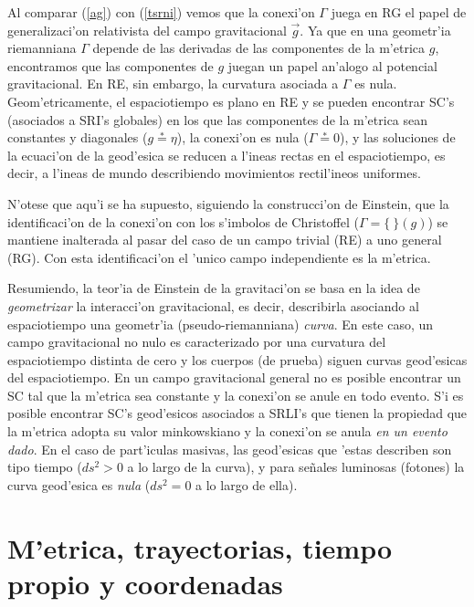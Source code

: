 Al comparar (\ref{ag}) con (\ref{tsrni}) vemos que la conexi'on $\Gamma$ juega en RG el papel de generalizaci'on relativista del campo gravitacional $\vec{g}$. Ya que en una geometr'ia riemanniana $\Gamma$ depende de las derivadas de las componentes de la m'etrica $g$, encontramos que las componentes de $g$ juegan un papel an'alogo al potencial gravitacional. En RE, sin embargo, la curvatura asociada a $\Gamma$ es nula. Geom'etricamente, el espaciotiempo es plano en RE y se pueden encontrar SC's (asociados a SRI's globales) en los que las componentes de la m'etrica sean constantes y diagonales ($g\stackrel{*}{=}\eta$), la conexi'on es nula ($\Gamma\stackrel{*}{=}0$), y las soluciones de la ecuaci'on de la geod'esica se reducen a l'ineas rectas en el espaciotiempo, es decir, a l'ineas de mundo describiendo movimientos rectil'ineos uniformes. 

N'otese que aqu'i se ha supuesto, siguiendo la construcci'on de
Einstein, que la identificaci'on de la conexi'on con los s'imbolos de Christoffel ($\Gamma %
=\{\ \}(g)$) se mantiene inalterada al pasar del caso de un campo
trivial (RE) a uno general (RG). Con esta identificaci'on el 'unico campo
independiente es la m'etrica.


Resumiendo, la teor'ia de Einstein de la gravitaci'on se basa en la idea de
\textit{geometrizar} la interacci'on gravitacional, es decir, describirla
asociando al espaciotiempo una geometr'ia (pseudo-riemanniana) \textit{curva}. En este caso, un campo gravitacional no nulo es caracterizado por una curvatura del espaciotiempo distinta de cero y los cuerpos (de prueba) siguen curvas geod'esicas del espaciotiempo. En un campo gravitacional general no es posible encontrar un SC tal que la m'etrica sea constante y la conexi'on se anule en todo evento. S'i es posible encontrar SC's geod'esicos asociados a SRLI's que tienen la propiedad que la m'etrica adopta su valor minkowskiano y la conexi'on se anula \textit{en un evento dado}.  En el caso de part'iculas masivas, las geod'esicas que 'estas describen son tipo tiempo ($ds^2>0$ a lo largo de la curva), y para se\~nales luminosas (fotones) la curva geod'esica es \textit{nula} ($ds^2=0$ a lo largo de ella).


\section{M'etrica, trayectorias, tiempo propio y coordenadas}

